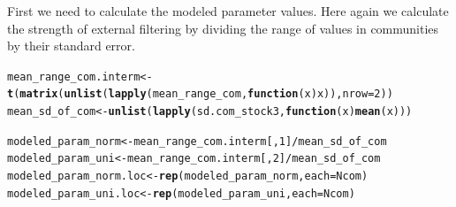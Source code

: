 \documentclass[12pt]{article}\usepackage[]{graphicx}\usepackage[]{color}
\makeatletter
\newcommand{\hlnum}[1]{\textcolor[rgb]{0.686,0.059,0.569}{#1}}%
\newcommand{\hlopt}[1]{\textcolor[rgb]{0,0,0}{#1}}%
\newcommand{\hlstd}[1]{\textcolor[rgb]{0.345,0.345,0.345}{#1}}%
\newcommand{\hlkwa}[1]{\textcolor[rgb]{0.161,0.373,0.58}{\textbf{#1}}}%
\newcommand{\hlkwb}[1]{\textcolor[rgb]{0.69,0.353,0.396}{#1}}%
\newcommand{\hlkwc}[1]{\textcolor[rgb]{0.333,0.667,0.333}{#1}}%
\newcommand{\hlkwd}[1]{\textcolor[rgb]{0.737,0.353,0.396}{\textbf{#1}}}%
\newenvironment{kframe}{%
 \def\at@end@of@kframe{}%
 \ifinner\ifhmode%
  \def\at@end@of@kframe{\end{minipage}}%
  \begin{minipage}{\columnwidth}%
 \fi\fi%
 \def\FrameCommand##1{\hskip\@totalleftmargin \hskip-\fboxsep
 \colorbox{shadecolor}{##1}\hskip-\fboxsep
     \hskip-\linewidth \hskip-\@totalleftmargin \hskip\columnwidth}%
 \MakeFramed {\advance\hsize-\width
   \@totalleftmargin\z@ \linewidth\hsize
   \@setminipage}}%
 {\par\unskip\endMakeFramed%
 \at@end@of@kframe}
\newenvironment{knitrout}{}{} %
\makeatother
\begin{document}
  First we need to calculate the modeled parameter values. Here again we calculate the strength of external filtering by dividing the range of values in communities by their standard error.
  
\begin{knitrout}\small
{}\color{fgcolor}\begin{kframe}
\begin{alltt}
\hlstd{mean_range_com.interm} \hlkwb{<-} \hlkwd{t}\hlstd{(}\hlkwd{matrix}\hlstd{(}\hlkwd{unlist}\hlstd{(}\hlkwd{lapply}\hlstd{(mean_range_com,} \hlkwa{function}\hlstd{(}\hlkwc{x}\hlstd{) x)),} \hlkwc{nrow} \hlstd{=} \hlnum{2}\hlstd{))}
\hlstd{mean_sd_of_com} \hlkwb{<-} \hlkwd{unlist}\hlstd{(}\hlkwd{lapply}\hlstd{(sd.com_stock3,} \hlkwa{function}\hlstd{(}\hlkwc{x}\hlstd{)} \hlkwd{mean}\hlstd{(x)))}

\hlstd{modeled_param_norm} \hlkwb{<-} \hlstd{mean_range_com.interm[,} \hlnum{1}\hlstd{]} \hlopt{/} \hlstd{mean_sd_of_com}
\hlstd{modeled_param_uni} \hlkwb{<-} \hlstd{mean_range_com.interm[,} \hlnum{2}\hlstd{]} \hlopt{/} \hlstd{mean_sd_of_com}
\hlstd{modeled_param_norm.loc} \hlkwb{<-} \hlkwd{rep}\hlstd{(modeled_param_norm,} \hlkwc{each} \hlstd{= Ncom)}
\hlstd{modeled_param_uni.loc} \hlkwb{<-} \hlkwd{rep}\hlstd{(modeled_param_uni,} \hlkwc{each} \hlstd{= Ncom)}
\end{alltt}
\end{kframe}
\end{knitrout}
\end{document}
